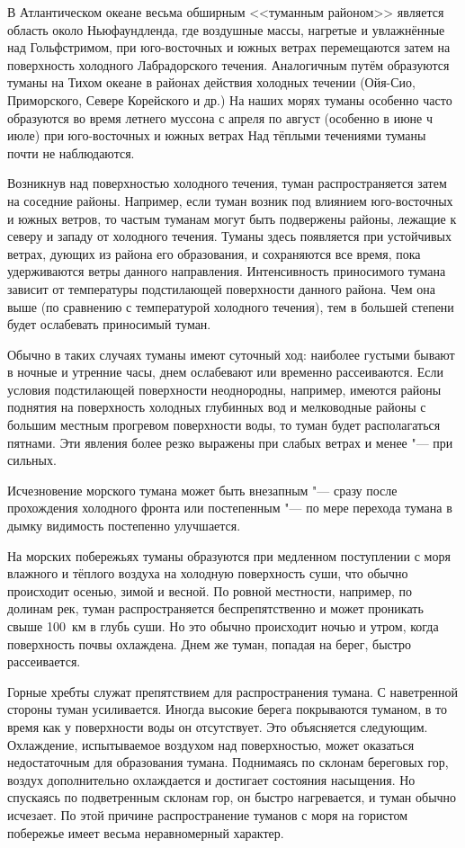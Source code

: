 В Атлантическом океане весьма обширным <<туманным районом>> является
область около Ньюфаундленда, где воздушные массы, нагретые и
увлажнённые над Гольфстримом, при юго-восточных и южных ветрах
перемещаются затем на поверхность холодного Лабрадорского
течения. Аналогичным путём образуются туманы на Тихом океане в районах
действия холодных течении (Ойя-Сио, Приморского, Севере Корейского и
др.) На наших морях туманы особенно часто образуются во время летнего
муссона с апреля по август (особенно в июне ч июле) при юго-восточных
и южных ветрах Над тёплыми течениями туманы почти не наблюдаются.

Возникнув над поверхностью холодного течения, туман распространяется
затем на соседние районы. Например, если туман возник под влиянием
юго-восточных и южных ветров, то частым туманам могут быть подвержены
районы, лежащие к северу и западу от холодного течения. Туманы здесь
появляется при устойчивых ветрах, дующих из района его образования, и
сохраняются все время, пока удерживаются ветры данного
направления. Интенсивность приносимого тумана зависит от температуры
подстилающей поверхности данного района. Чем она выше (по сравнению с
температурой холодного течения), тем в большей степени будет
ослабевать приносимый туман.

Обычно в таких случаях туманы имеют суточный ход: наиболее густыми
бывают в ночные и утренние часы, днем ослабевают или временно
рассеиваются. Если условия подстилающей поверхности неоднородны,
например, имеются районы поднятия на поверхность холодных глубинных
вод и мелководные районы с большим местным прогревом поверхности воды,
то туман будет располагаться пятнами. Эти явления более резко выражены
при слабых ветрах и менее "--- при сильных.

Исчезновение морского тумана может быть внезапным "--- сразу после
прохождения холодного фронта или постепенным "--- по мере перехода тумана
в дымку видимость постепенно улучшается.

На морских побережьях туманы образуются при медленном поступлении с
моря влажного и тёплого воздуха на холодную поверхность суши, что
обычно происходит осенью, зимой и весной. По ровной местности,
например, по долинам рек, туман распространяется беспрепятственно и
может проникать свыше 100~км в глубь суши. Но это обычно происходит
ночью и утром, когда поверхность почвы охлаждена. Днем же туман,
попадая на берег, быстро рассеивается.

Горные хребты служат препятствием для распространения тумана. С
наветренной стороны туман усиливается. Иногда высокие берега
покрываются туманом, в то время как у поверхности воды он
отсутствует. Это объясняется следующим. Охлаждение, испытываемое
воздухом над поверхностью, может оказаться недостаточным для
образования тумана. Поднимаясь по склонам береговых гор, воздух
дополнительно охлаждается и достигает состояния насыщения. Но
спускаясь по подветренным склонам гор, он быстро нагревается, и туман
обычно исчезает. По этой причине распространение туманов с моря на
гористом побережье имеет весьма неравномерный характер.

